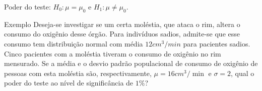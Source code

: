 \documentclass[8pt]{beamer}
\begin{document}
\begin{frame}{Poder do teste: $H_0:\mu = \mu_0$ e $H_1: \mu \neq \mu_0$.}

\large
\begin{block}{Exemplo}
	Deseja-se investigar se um certa moléstia, que ataca o rim, altera o consumo do oxigênio desse órgão. Para indivíduos sadios, admite-se que esse consumo tem distribuição normal com média $12cm^3/min$ para pacientes sadios.
	Cinco pacientes com a moléstia tiveram o consumo de oxigênio no rim mensurado. Se a média e o desvio padrão populacional de consumo de oxigênio de pessoas com esta moléstia são, respectivamente, $\mu=16cm^3/\min$ e $\sigma=2$, qual o poder do teste ao nível de significância de $1\%$?
\end{block}
\normalsize

\end{frame}
\end{document}
